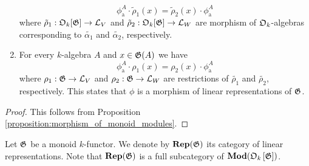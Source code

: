 \begin{corollary}
\begin{enumerate}[label=\emph{\textbf{(\roman*)}}, leftmargin=1.5em]
$$\phi_{\mathrm{a}}^A \cdot \tilde{\rho}_1(x) = \tilde{\rho}_2(x) \cdot \phi_{\mathrm{a}}^A$$
where $\tilde{\rho}_1:{\mathfrak O}_k[{\mathfrak G}] \rightarrow {\mathcal L}_V$ and $\tilde{\rho}_2:{\mathfrak O}_k[{\mathfrak G}] \rightarrow {\mathcal L}_W$ are morphism of ${\mathfrak O}_k$-algebras corresponding to $\tilde{\alpha_1}$ and $\tilde{\alpha_2}$, respectively.
\item For every $k$-algebra $A$ and $x\in {\mathfrak G}(A)$ we have
$$\phi_{\mathrm{a}}^A \cdot \rho_1(x) = \rho_2(x) \cdot \phi_{\mathrm{a}}^A$$
where $\rho_1:{\mathfrak G} \rightarrow {\mathcal L}_V$ and $\rho_2:{\mathfrak G} \rightarrow {\mathcal L}_W$ are restrictions of $\tilde{\rho_1}$ and $\tilde{\rho_2}$, respectively. This states that $\phi$ is a morphism of linear representations of ${\mathfrak G}$.
\end{enumerate}
\end{corollary}
\begin{proof}
This follows from Proposition \ref{proposition:morphism_of_monoid_modules}.
\end{proof}
\noindent
Let ${\mathfrak G}$ be a monoid $k$-functor. We denote by $\mathbf{Rep}({\mathfrak G})$ its category of linear representations. Note that $\mathbf{Rep}({\mathfrak G})$ is a full subcategory of $\mathbf{Mod}({\mathfrak O}_k\left[{\mathfrak G}\right])$.

\small






